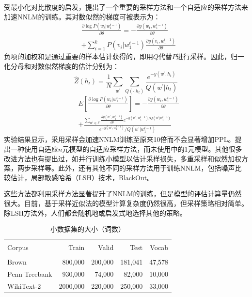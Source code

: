 \documentclass[a4paper, 12pt, twocolumn]{article}
\begin{document}
受最小化对比散度的启发，\cite{bengio2008adaptive}提出了一个重要的采样方法和一个自适应的采样方法来加速NNLM的训练。其对数似然的梯度可被表示为：
\begin{equation}
  \begin{aligned}
    &\frac{\partial \log P(w_t|w_1^{t-1})}{\partial \theta} =-\frac{\partial y(w_t,w_1^{t-1})}{\partial \theta} \\ 
    & + \sum _{i=1}^k P(v_i|w_1^{t-1})\frac{\partial y(v_i, w_1^{t-1})}{\partial \theta}
  \end{aligned}
  \label{eq:10}
\end{equation}
负项的加权和是通过重要的样本估计获得的，即用$Q$代替$P$进行采样。因此，归一化分母和对数似然梯度的估计分别为：
\begin{equation}
  \hat{Z}\left(h_{t}\right)=\frac{1}{N} \sum_{w^{\prime}} \sum_{Q\left(\cdot | h_{t}\right)} \frac{e^{-y\left(w^{\prime}, h_{t}\right)}}{Q\left(w^{\prime} | h_{t}\right)}
  \label{eq:11}
\end{equation}
\begin{equation}
  \begin{aligned}
    &E\left[\frac{\partial \log P\left(w_{t} | w_{1}^{t-1}\right)}{\partial \theta}\right]=-\frac{\partial y\left(w_{t}, w_{1}^{t-1}\right)}{\partial \theta} 
\\ &+\frac{\sum_{w^{\prime} \in \Gamma} \frac{\partial y\left(w^{\prime}, w_{1}^{t-1}\right)}{\partial \theta} e^{-y\left(w^{\prime}, w_{1}^{t-1}\right) / Q\left(w^{\prime} | w_{1}^{t-1}\right)}}{e^{-y\left(w^{\prime}, w_{1}^{t-1}\right)} / Q\left(w^{\prime} | w_{1}^{t-1}\right)}
  \end{aligned}
  \label{eq:12}
\end{equation}
实验结果显示，采用采样会加速NNLM训练至原来10倍而不会显著增加PPL。\cite{bengio2008adaptive}提出一种使用自适应$n$元模型的自适应采样方法，而未使用\cite{bengio2003neural}中的1元模型。其他很多改进方法也有提出过，如并行训练小模型以估计采样损失，多重采样和似然加权方案，两步采样等。此外，还有其他不同的采样方法用于训练NNLM，包括噪声比较估计，局部敏感哈希（LSH）技术，BlackOut。

这些方法都利用采样方法显著提升了NNLM的训练，但是模型的评估计算量仍然很大。目前，基于采样近似法的模型计算复杂度仍然很高，但采样策略相对简单。除LSH方法外，人们都会随机地或启发式地选择其他的策略。

\begin{table}[t]
  \tiny
  \centering
  \caption{小数据集的大小（词数）}
  \begin{tabular}{lrrrr}
    \toprule \\ 
    Corpus & Train & Valid & Test & Vocab \\
    \midrule \\
    Brown & 800,000 & 200,000 & 181,041 & 47,578 \\ 
    Penn Treebank & 930,000 & 74,000 & 82,000 & 10,000 \\ 
    WikiText-2 &2000,000 & 220,000 & 250,000 & 33,000 \\ 
    \bottomrule
  \end{tabular}
  \label{table:1}
\end{table}
\end{document}
